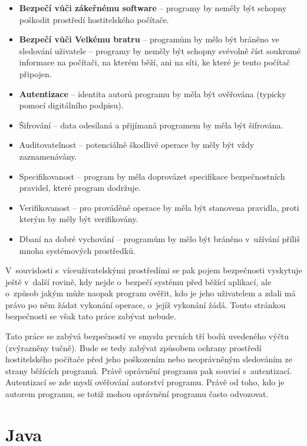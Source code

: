 \begin{itemize}
  \item {\bf Bezpečí vůči zákeřnému software} -- programy by neměly být schopny poškodit prostředí hostitelského počítače.
  \item {\bf Bezpečí vůči Velkému bratru} -- programům by mělo být bráněno ve sledování uživatele -- programy by neměly být schopny svévolně číst soukromé informace na počítači, na kterém běží, ani na síti, ke které je tento počítač připojen.
  \item {\bf Autentizace} -- identita autorů programu by měla být ověřována (typicky pomocí digitálního podpisu).
  \item Šifrování -- data odesílaná a přijímaná programem by měla být šifrována.
  \item Auditovatelnost -- potenciálně škodlivé operace by měly být vždy zaznamenávány.
  \item Specifikovanost -- program by měla doprovázet specifikace bezpečnostních pravidel, které program dodržuje.
  \item Verifikovanost -- pro prováděné operace by měla být stanovena pravidla, proti kterým by měly být verifikovány.
  \item Dbaní na dobré vychování -- programům by mělo být bráněno v~užívání příliš mnoha systémových prostředků.
\end{itemize}

V~souvislosti s~víceuživatelskými prostředími se pak pojem bezpečnosti vyskytuje ještě v~další rovině, kdy nejde o~bezpečí systému před běžící aplikací, ale o~způsob jakým může naopak program ověřit, kdo je jeho uživatelem a zdali má právo po něm žádat vykonání operace, o~jejíž vykonání žádá. Touto stránkou bezpečnosti se však tato práce zabývat nebude.

Tato práce se zabývá bezpečností ve smyslu prvních tří bodů uvedeného výčtu (zvýrazněny tučně). Bude se tedy zabývat způsobem ochrany prostředí hostitelského počítače před jeho poškozením nebo neoprávněným sledováním ze strany běžících programů. Právě oprávnění programu pak souvisí s~autentizací. Autentizací se zde myslí ověřování autorství programu. Právě od toho, kdo je autorem programu, se totiž mohou oprávnění programu často odvozovat.

\section{Java}

